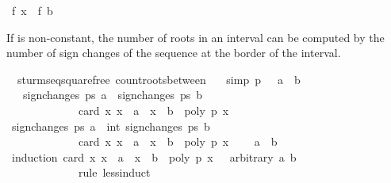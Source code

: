 \begin{isabellebody}
\ {\isachardoublequoteopen}f\ x\ {\isacharequal}\ f\ b{\isachardoublequoteclose}\ \isacommand{{\isachardot}}\isamarkupfalse%
\isanewline
{}\isamarkupfalse%
%
\endisatagproof
{\isafoldproof}%
%
\isadelimproof
%
\endisadelimproof
%
\begin{isamarkuptext}%
If  is non-constant, the number of roots in an interval can 
  be computed by the number of sign changes of the sequence at 
  the border of the interval.%
\end{isamarkuptext}%
\isamarkuptrue%
\isamarkupfalse%
\ {\isacharparenleft}\ sturm{\isacharunderscore}seq{\isacharunderscore}squarefree{\isacharparenright}\ count{\isacharunderscore}roots{\isacharunderscore}between{\isacharcolon}\isanewline
\ \ \ {\isacharbrackleft}simp{\isacharbrackright}{\isacharcolon}\ {\isachardoublequoteopen}p\ {\isasymnoteq}\ {}{\isachardoublequoteclose}\ {\isachardoublequoteopen}a\ {\isasymle}\ b{\isachardoublequoteclose}\isanewline
\ \ \ {\isachardoublequoteopen}sign{\isacharunderscore}changes\ ps\ a\ {\isacharminus}\ sign{\isacharunderscore}changes\ ps\ b\ {\isacharequal}\ \isanewline
\ \ \ \ \ \ \ \ \ \ \ \ \ card\ {\isacharbraceleft}x{\isachardot}\ x\ {\isachargreater}\ a\ {\isasymand}\ x\ {\isasymle}\ b\ {\isasymand}\ poly\ p\ x\ {\isacharequal}\ {}{\isacharbraceright}{\isachardoublequoteclose}\isanewline
%
\isadelimproof
%
\endisadelimproof
%
\isatagproof
{}\isamarkupfalse%
{\isacharminus}\isanewline
\ \ \isamarkupfalse%
\ {\isachardoublequoteopen}sign{\isacharunderscore}changes\ ps\ a\ {\isacharminus}\ int\ {\isacharparenleft}sign{\isacharunderscore}changes\ ps\ b{\isacharparenright}\ {\isacharequal}\ \isanewline
\ \ \ \ \ \ \ \ \ \ \ \ \ card\ {\isacharbraceleft}x{\isachardot}\ x\ {\isachargreater}\ a\ {\isasymand}\ x\ {\isasymle}\ b\ {\isasymand}\ poly\ p\ x\ {\isacharequal}\ {}{\isacharbraceright}{\isachardoublequoteclose}\ \isamarkupfalse%
\ {\isacharbackquoteopen}a\ {\isasymle}\ b{\isacharbackquoteclose}\isanewline
\ \ \isamarkupfalse%
\ {\isacharparenleft}induction\ {\isachardoublequoteopen}card\ {\isacharbraceleft}x{\isachardot}\ x\ {\isachargreater}\ a\ {\isasymand}\ x\ {\isasymle}\ b\ {\isasymand}\ poly\ p\ x\ {\isacharequal}\ {}{\isacharbraceright}{\isachardoublequoteclose}\ arbitrary{\isacharcolon}\ a\ b\isanewline
\ \ \ \ \ \ \ \ \ \ \ \ \ rule{\isacharcolon}\ less{\isacharunderscore}induct{\isacharparenright}\isanewline
\ \ \ \ \isamarkupfalse%

\end{isabellebody}
